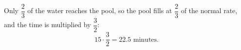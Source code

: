 Only $\dfrac{2}{3}$ of the water reaches the pool, so the pool fills at $\dfrac{2}{3}$ of the normal rate, and the time is multiplied by $\dfrac{3}{2}$:
\[
15\cdot\dfrac{3}{2}=\boxed{22.5}\text{ minutes}.
\]
